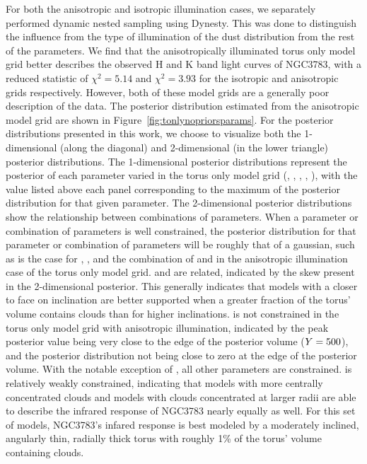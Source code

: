 \par For both the anisotropic and isotropic illumination cases, we separately performed dynamic nested sampling using Dynesty. This was done to distinguish the influence from the type of illumination of the dust distribution from the rest of the parameters. We find that the anisotropically illuminated torus only model grid better describes the observed H and K band light curves of NGC3783, with a reduced statistic of $\chi^2 = 5.14$ and $\chi^2 = 3.93$ for the isotropic and anisotropic grids respectively. However, both of these model grids are a generally poor description of the data. The posterior distribution estimated from the anisotropic model grid are shown in Figure~\ref{fig:tonlynopriorsparams}. For the posterior distributions presented in this work, we choose to visualize both the 1-dimensional (along the diagonal) and 2-dimensional (in the lower triangle) posterior distributions. The 1-dimensional posterior distributions represent the posterior of each parameter varied in the torus only model grid (\vff, \p, \inc, \Y, \sig), with the value listed above each panel corresponding to the maximum of the posterior distribution for that given parameter. The 2-dimensional posterior distributions show the relationship between combinations of parameters. When a parameter or combination of parameters is well constrained, the posterior distribution for that parameter or combination of parameters will be roughly that of a gaussian, such as is the case for \inc, \sig, and the combination of \inc and \sig in the anisotropic illumination case of the torus only model grid. \inc and \vff are related, indicated by the skew present in the 2-dimensional posterior. This generally indicates that models with a closer to face on inclination are better supported when a greater fraction of the torus' volume contains clouds than for higher inclinations. \Y is not constrained in the torus only model grid with anisotropic illumination, indicated by the peak posterior value being very close to the edge of the posterior volume ($Y = 500$), and the posterior distribution not being close to zero at the edge of the posterior volume. With the notable exception of \Y, all other parameters are constrained. \p is relatively weakly constrained, indicating that models with more centrally concentrated clouds and models with clouds concentrated at larger radii are able to describe the infrared response of NGC3783 nearly equally as well. For this set of models, NGC3783's infared response is best modeled by a moderately inclined, angularly thin, radially thick torus with roughly 1\% of the torus' volume containing clouds.

